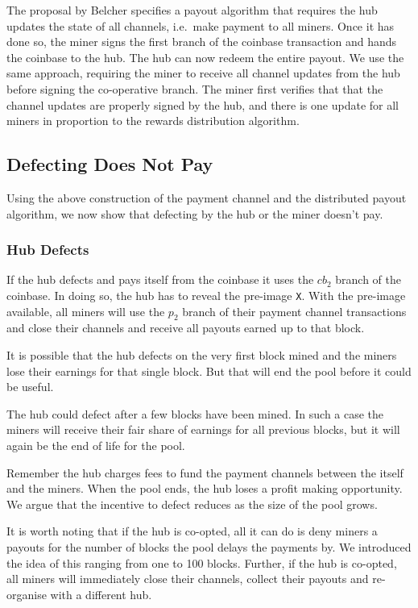 \documentclass{article}
\begin{document}
The proposal by Belcher specifies a payout algorithm that requires the
hub updates the state of all channels, i.e.\ make payment to all
miners. Once it has done so, the miner signs the first branch of the
coinbase transaction and hands the coinbase to the hub. The hub can
now redeem the entire payout. We use the same approach, requiring the
miner to receive all channel updates from the hub before signing the
co-operative branch. The miner first verifies that that the channel
updates are properly signed by the hub, and there is one update for
all miners in proportion to the rewards distribution algorithm.

\subsection{Defecting Does Not Pay}\label{ref:defecting}

Using the above construction of the payment channel and the
distributed payout algorithm, we now show that defecting by the hub or
the miner doesn't pay.

\subsubsection{Hub Defects}\label{ref:hub-defects}

If the hub defects and pays itself from the coinbase it uses the
$cb_2$ branch of the coinbase. In doing so, the hub has to reveal the
pre-image \verb|X|. With the pre-image available, all miners will use
the $p_2$ branch of their payment channel transactions and close their
channels and receive all payouts earned up to that block.

It is possible that the hub defects on the very first block mined and
the miners lose their earnings for that single block. But that will
end the pool before it could be useful.

The hub could defect after a few blocks have been mined. In such a
case the miners will receive their fair share of earnings for all
previous blocks, but it will again be the end of life for the pool.

Remember the hub charges fees to fund the payment channels between the
itself and the miners. When the pool ends, the hub loses a profit
making opportunity. We argue that the incentive to defect reduces as
the size of the pool grows.

It is worth noting that if the hub is co-opted, all it can do is deny
miners a payouts for the number of blocks the pool delays the payments
by. We introduced the idea of this ranging from one to 100
blocks. Further, if the hub is co-opted, all miners will immediately
close their channels, collect their payouts and re-organise with a
different hub.
\end{document}
